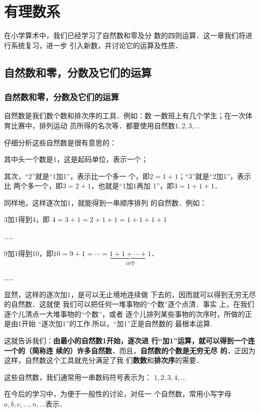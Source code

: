 \chapter{有理数系}

    在小学算术中，我们已经学习了自然数和零及分
数的四则运算．这一章我们将进行系统复习，进一步
引入新数，并讨论它的运算及性质．

\section{自然数和零，分数及它们的运算}

\subsection{自然数和零，分数及它们的运算}

自然数是我们数个数和排次序的工具．例如：数
一数班上有几个学生；在一次体育比赛中，排列运动
员所得的名次等．都要使用自然数$1,  2,  3,\ldots$

    仔细分析这些自然数是很有意思的：
    
    其中头一个数是1，这是起码单位，表示一个；

    其次，“2”就是“1加1”，表示比一个多一
个，即$2=1+1$；“3”就是“2加1”，表示比
两个多一个，即$3=2+1$，也就是“1加1再加
1”，即$3=1+1+1$．

    同样地，这样逐次加1，就能得到一串顺序排列
的自然数．例如：  

3加1得到4，即
$4=3+1=2+1+1=1+1+1+1$

……

9加1得到10，即$10= 9+1=\cdots=\underbrace{1+1+\cdots+1}_{10\text{个}}$．

……

显然，这样的逐次加1，是可以无止境地连续做
下去的，因而就可以得到无穷无尽的自然数．这就使
我们可以把任何一堆事物的“个数”逐个点清．事实
上，在我们逐个儿清点一大堆事物的“个数”，或者
逐个儿排列某些事物的次序时，所做的正是由1开始
“逐次加1”的工作.所以，“加1”正是自然数的
最根本运算.

    这就告诉我们：\textbf{由最小的自然数1开始，逐次进
行“加1”运算，就可以得到一个连一个的（简称连
续的）许多自然数．}而且，\textbf{自然数的个数是无穷无尽
的．}正因为这样，自然数这个工具就充分满足了我
们\textbf{数数}和\textbf{排次序}的需要．

这些自然数，我们通常用一串数码符号表示为：
$1,2,3,4,\ldots$

在今后的学习中，为便于一般性的讨论，对任一
个自然数，常用小写字母$a,b,c,\ldots,n,\ldots$表示．

